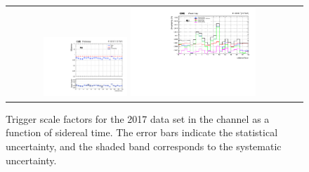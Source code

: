 \begin{figure}[!htb]
  \begin{center}
    \begin{tabular}{cc}
      \includegraphics[width=0.30\textwidth]{fig_2017_sidereal/g_emu_sidereal_FullSystUncBand.pdf}
      \includegraphics[width=0.45\textwidth]{fig_2017_sidereal/g_emu_sidereal_ErrorsBreakdown.pdf}\\
    \end{tabular}
    \caption{Trigger scale factors for the 2017 data set in the \emu channel as a function of sidereal time.
            The error bars indicate the statistical uncertainty, and the shaded band corresponds to the systematic uncertainty.
            }
    \label{TrigSF_SideReal_2017_1}
  \end{center}
\end{figure}